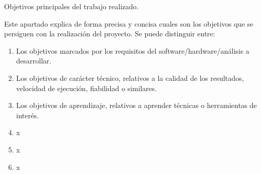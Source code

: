 
Objetivos principales del trabajo realizado.

Este apartado explica de forma precisa y concisa cuales son los objetivos que se persiguen con la realización del proyecto. Se puede distinguir entre:
\begin{enumerate}
    \item Los objetivos marcados por los requisitos del software/hardware/análisis a desarrollar.
    \item Los objetivos de carácter técnico, relativos a la calidad de los resultados, velocidad de ejecución, fiabilidad o similares.
    \item Los objetivos de aprendizaje, relativos a aprender técnicas o herramientas de interés. 
    \item x
    \item x
    \item x
    
\end{enumerate}








